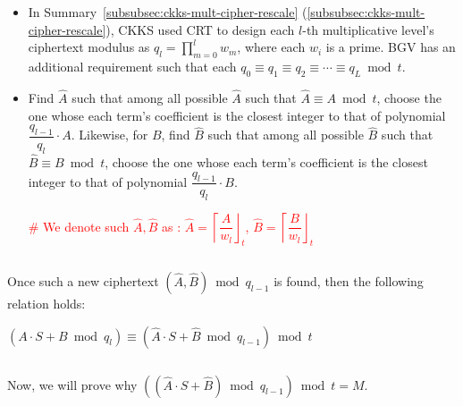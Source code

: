 \begin{itemize}
\item In Summary~\ref*{subsubsec:ckks-mult-cipher-rescale} (\autoref{subsubsec:ckks-mult-cipher-rescale}), CKKS used CRT to design each $l$-th multiplicative level's ciphertext modulus as $q_l = \prod\limits_{m=0}^{l}w_m$, where each $w_i$ is a prime. BGV has an additional requirement such that each $q_0 \equiv q_1 \equiv q_2 \equiv \cdots \equiv q_L \bmod t$.
\item Find $\hat A$ such that among all possible $\hat A$ such that $\hat A \equiv A \bmod t$, choose the one whose each term's coefficient is the closest integer to that of polynomial $\dfrac{q_{l-1}}{q_l}\cdot A$. Likewise, for $B$, find $\hat B$ such that among all possible $\hat B$ such that $\hat B \equiv B \bmod t$, choose the one whose each term's coefficient is the closest integer to that of polynomial $\dfrac{q_{l-1}}{q_l}\cdot B$.

\textcolor{red}{\# We denote such $\hat A, \hat B$ as : $\hat A = \left\lceil\dfrac{A}{w_l}\right\rfloor_{t}$, \text{ } $\hat B = \left\lceil\dfrac{B}{w_l}\right\rfloor_{t}$ }

\end{itemize}

$ $


Once such a new ciphertext $(\hat A, \hat B) \bmod q_{l-1}$ is found, then the following relation holds:

$(A\cdot S + B \bmod q_{l}) \equiv (\hat A \cdot S + \hat B \bmod q_{l-1}) \bmod t $




$ $

Now, we will prove why $((\hat A \cdot S + \hat B) \bmod q_{l-1}) \bmod t = M$. 

